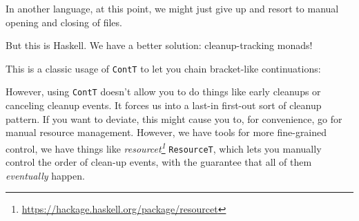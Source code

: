 \documentclass[]{article}
\newenvironment{Shaded}{}{}
\newcommand{\DataTypeTok}[1]{\textcolor[rgb]{0.56,0.13,0.00}{#1}}
\newcommand{\FunctionTok}[1]{\textcolor[rgb]{0.02,0.16,0.49}{#1}}
\newcommand{\KeywordTok}[1]{\textcolor[rgb]{0.00,0.44,0.13}{\textbf{#1}}}
\newcommand{\NormalTok}[1]{#1}
\newcommand{\OperatorTok}[1]{\textcolor[rgb]{0.40,0.40,0.40}{#1}}
\newcommand{\OtherTok}[1]{\textcolor[rgb]{0.00,0.44,0.13}{#1}}
\renewcommand{\href}[2]{#2\footnote{\url{#1}}}
\begin{document}
In another language, at this point, we might just give up and resort to manual
opening and closing of files.

But this is Haskell. We have a better solution: cleanup-tracking monads!

This is a classic usage of \texttt{ContT} to let you chain bracket-like
continuations:

\begin{Shaded}
\end{Shaded}

However, using \texttt{ContT} doesn't allow you to do things like early cleanups
or canceling cleanup events. It forces us into a last-in first-out sort of
cleanup pattern. If you want to deviate, this might cause you to, for
convenience, go for manual resource management. However, we have tools for more
fine-grained control, we have things like
\emph{\href{https://hackage.haskell.org/package/resourcet}{resourcet}}
\texttt{ResourceT}, which lets you manually control the order of clean-up
events, with the guarantee that all of them \emph{eventually} happen.
\end{document}
